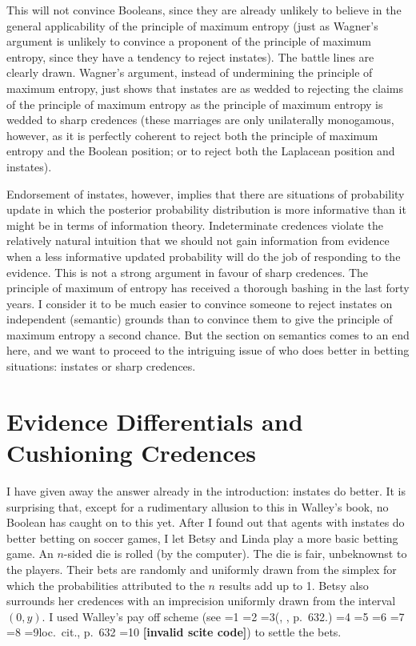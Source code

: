 \documentclass[journal]{IEEEtran}
\newif\ifNumericalOrYear
\newcommand{\PageP}{p.~}
\newcommand{\PageP}{}
\newcommand{\scite}[3]{\ifnum#1=1\ifNumericalOrYear\citep{#2}\else\citeyearpar{#2}\fi\else
\ifnum#1=2\ifNumericalOrYear\citep[#3]{#2}\else\citep[{\PageP}#3]{#2}\fi\else
\ifnum#1=3\ifNumericalOrYear(\citet[#3]{#2})\else(\citeauthor{#2}, \citeyear{#2}, {\PageP}#3.)\fi\else
\ifnum#1=4\ifNumericalOrYear\citet{#2}\else\citet{#2}\fi\else
\ifnum#1=5\ifNumericalOrYear(\citet{#2})\else\citep{#2}\fi\else
\ifnum#1=6\ifNumericalOrYear(\citet[#3]{#2})\else\citep[{\PageP}#3]{#2}\fi\else
\ifnum#1=7\ifNumericalOrYear\citep{#2}\else\citealp{#2}\fi\else
\ifnum#1=8\ifNumericalOrYear\citep[#3]{#2}\else\citealp[{\PageP}#3]{#2}\fi\else
\ifnum#1=9\ifNumericalOrYear\citep[#3]{#2}\else{}loc.\ cit., {\PageP}#3\fi\else
\ifnum#1=10\ifNumericalOrYear\citep{#2}\else\citeyear{#2}\fi\else
\textbf{[invalid scite code]}\fi\fi\fi\fi\fi\fi\fi\fi\fi\fi}
\begin{document}
This will not convince Booleans, since they are already unlikely to
believe in the general applicability of the principle of maximum
entropy (just as Wagner's argument is unlikely to convince a proponent
of the principle of maximum entropy, since they have a tendency to
reject instates). The battle lines are clearly drawn. Wagner's
argument, instead of undermining the principle of maximum entropy,
just shows that instates are as wedded to rejecting the claims of the
principle of maximum entropy as the principle of maximum entropy is
wedded to sharp credences (these marriages are only unilaterally
monogamous, however, as it is perfectly coherent to reject both the
principle of maximum entropy and the Boolean position; or to reject
both the Laplacean position and instates). 

Endorsement of instates, however, implies that there are situations of
probability update in which the posterior probability distribution is
more informative than it might be in terms of information theory.
Indeterminate credences violate the relatively natural intuition that
we should not gain information from evidence when a less informative
updated probability will do the job of responding to the evidence.
This is not a strong argument in favour of sharp credences. The
principle of maximum of entropy has received a thorough bashing in the
last forty years. I consider it to be much easier to convince someone
to reject instates on independent (semantic) grounds than to convince
them to give the principle of maximum entropy a second chance. But the
section on semantics comes to an end here, and we want to proceed to
the intriguing issue of who does better in betting situations:
instates or sharp credences.

\section{Evidence Differentials and Cushioning Credences}
\label{WalleysWorldCupWoes}

I have given away the answer already in the introduction: instates do
better. It is surprising that, except for a rudimentary allusion to
this in Walley's book, no Boolean has caught on to this yet. After I
found out that agents with instates do better betting on soccer games,
I let Betsy and Linda play a more basic betting game. An $n$-sided die
is rolled (by the computer). The die is fair, unbeknownst to the
players. Their bets are randomly and uniformly drawn from the simplex
for which the probabilities attributed to the $n$ results add up to 1.
Betsy also surrounds her credences with an imprecision uniformly drawn
from the interval $(0,y)$. I used Walley's pay off scheme (see
\scite{8}{walley91}{632}) to settle the bets.
\end{document}
